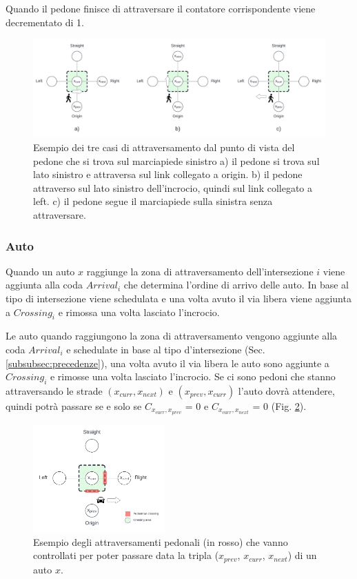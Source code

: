 Quando il pedone finisce di attraversare il contatore corrispondente viene decrementato di 1.


\begin{figure}[ht]
    \centering
    \includegraphics[width=\textwidth]{images/pedestrian_crossing}
    \caption{
        Esempio dei tre casi di attraversamento dal punto di vista del pedone che si trova sul marciapiede sinistro
        a) il pedone si trova sul lato sinistro e attraversa sul link collegato a origin.
        b) il pedone attraverso sul lato sinistro dell'incrocio, quindi sul link collegato a left.
        c) il pedone segue il marciapiede sulla sinistra senza attraversare.
    }
    \label{fig:pedestria-crossing}
\end{figure}


\subsubsection{Auto}
Quando un auto $x$ raggiunge la zona di attraversamento dell'intersezione $i$ viene aggiunta alla coda $\textit{Arrival}_i$ che
determina l'ordine di arrivo delle auto. In base al tipo di intersezione viene schedulata e una volta avuto il via libera
viene aggiunta a $\textit{Crossing}_i$ e rimossa una volta lasciato l'incrocio.

Le auto quando raggiungono la zona di attraversamento vengono aggiunte alla coda $\textit{Arrival}_i$ e schedulate
in base al tipo d'intersezione (Sec. \ref{subsubsec:precedenze}), una volta avuto il via libera le auto sono aggiunte a $\textit{Crossing}_i$
e rimosse una volta lasciato l'incrocio.
%
Se ci sono pedoni che stanno attraversando le strade $(x_{curr}, x_{next})$ e $(x_{prev}, x_{curr})$ l'auto dovrà attendere,
quindi potrà passare se e solo se $C_{x_{curr},x_{prev}}$ = 0 e $C_{x_{curr},x_{next}}$ = 0 (Fig. \ref{fig:auto-ped-crossing}).

\begin{figure}[ht]
    \centering
    \includegraphics[width=0.45\textwidth]{images/crossing_auto_ped_crossing}
    \caption{Esempio degli attraversamenti pedonali (in rosso) che vanno controllati
        per poter passare data la tripla ($x_{prev}$, $x_{curr}$, $x_{next}$) di un auto $x$.}
    \label{fig:auto-ped-crossing}
\end{figure}

